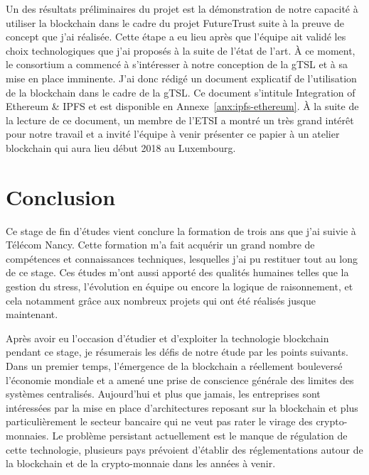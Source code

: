 \documentclass{tnreport}
\begin{document}
Un des résultats préliminaires du projet est la démonstration de notre capacité à utiliser la blockchain dans le cadre du projet FutureTrust suite à la preuve de concept que j'ai réalisée. Cette étape a eu lieu après que l'équipe ait validé les choix technologiques que j'ai proposés à la suite de l'état de l'art. À ce moment, le consortium a commencé à s'intéresser à notre conception de la gTSL et à sa mise en place imminente. J'ai donc rédigé un document explicatif de l'utilisation de la blockchain dans le cadre de la gTSL. Ce document s'intitule Integration of Ethereum \& IPFS et est disponible en Annexe~\ref{anx:ipfs-ethereum}. À la suite de la lecture de ce document, un membre de l'ETSI a montré un très grand intérêt pour notre travail et a invité l'équipe à venir présenter ce papier à un atelier blockchain qui aura lieu début 2018 au Luxembourg.

\chapter{Conclusion}

Ce stage de fin d'études vient conclure la formation de trois ans que j'ai suivie à Télécom Nancy. Cette formation m'a fait acquérir un grand nombre de compétences et connaissances techniques, lesquelles j'ai pu restituer tout au long de ce stage. Ces études m'ont aussi apporté des qualités humaines telles que la gestion du stress, l'évolution en équipe ou encore la logique de raisonnement, et cela notamment grâce aux nombreux projets qui ont été réalisés jusque maintenant.


Après avoir eu l'occasion d'étudier et d'exploiter la technologie blockchain pendant ce stage, je résumerais les défis de notre étude par les points suivants. Dans un premier temps, l'émergence de la blockchain a réellement bouleversé l'économie mondiale et a amené une prise de conscience générale des limites des systèmes centralisés. Aujourd'hui et plus que jamais, les entreprises sont intéressées par la mise en place d'architectures reposant sur la blockchain et plus particulièrement le secteur bancaire qui ne veut pas rater le virage des crypto-monnaies. Le problème persistant actuellement est le manque de régulation de cette technologie, plusieurs pays prévoient d'établir des réglementations autour de la blockchain et de la crypto-monnaie dans les années à venir.
\end{document}

